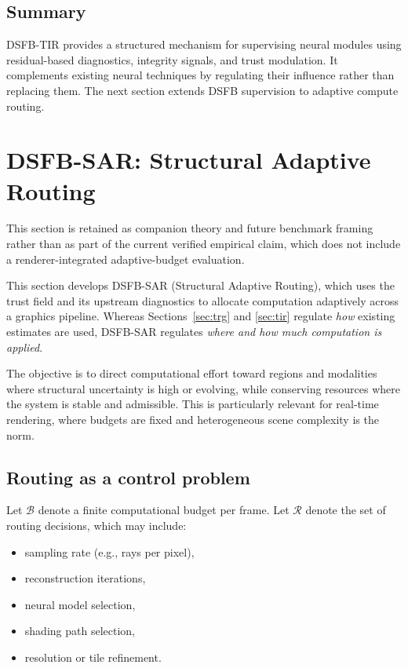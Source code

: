 \documentclass[11pt]{article}
\theoremstyle{definition}
\theoremstyle{plain}
\begin{document}

\subsection{Summary}

DSFB-TIR provides a structured mechanism for supervising neural modules using residual-based diagnostics, integrity signals, and trust modulation. It complements existing neural techniques by regulating their influence rather than replacing them. The next section extends DSFB supervision to adaptive compute routing.


\section{DSFB-SAR: Structural Adaptive Routing}

This section is retained as companion theory and future benchmark framing rather than as part of the current verified empirical claim, which does not include a renderer-integrated adaptive-budget evaluation.
\label{sec:sar}

This section develops DSFB-SAR (Structural Adaptive Routing), which uses the trust field and its upstream diagnostics to allocate computation adaptively across a graphics pipeline. Whereas Sections~\ref{sec:trg} and \ref{sec:tir} regulate \emph{how} existing estimates are used, DSFB-SAR regulates \emph{where and how much computation is applied}.

The objective is to direct computational effort toward regions and modalities where structural uncertainty is high or evolving, while conserving resources where the system is stable and admissible. This is particularly relevant for real-time rendering, where budgets are fixed and heterogeneous scene complexity is the norm.


\subsection{Routing as a control problem}

Let $\mathcal{B}$ denote a finite computational budget per frame. Let $\mathcal{R}$ denote the set of routing decisions, which may include:
\begin{itemize}[leftmargin=1.5em]
    \item sampling rate (e.g., rays per pixel),
    \item reconstruction iterations,
    \item neural model selection,
    \item shading path selection,
    \item resolution or tile refinement.
\end{itemize}
\end{document}
